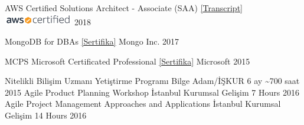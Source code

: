 
    \begin{cvhonors}
        \cvhonor
        {AWS Certified Solutions Architect - Associate (SAA)}
        {\href{https://www.certmetrics.com/amazon/public/transcript.aspx?transcript=HK7EEBT12EE41BGN}{[Transcript]}} 
        {\includegraphics[height=5mm]{./img/aws-certified-logo.png}}
        {2018}

        \cvhonor
        {MongoDB for DBAs}
        {\href{http://bit.ly/guneysu-mongodb-for-dba-certificate}{[Sertifika]}}
        {Mongo Inc.}
        {2017}

        \cvhonor
        {MCPS}
        {Microsoft Certificated Professional \href{http://docs.kariyer.net/uploadfiles/executive/0000/0000/9267/488/Certificate_1.pdf?filesec=5dY0D3Kbe72WC8jXyTXZtsqpxLi1WwOJJWy91Xr06Ix8SFBJvKdhj3YKHFnw7RaWqfs54O4Ya9qEBQFCddGhbqJe369hJjyh!e!}{[Sertifika]}}
        {Microsoft}
        {2015}
    \end{cvhonors}


    \begin{cvhonors} 
        \cvhonor
            {Nitelikli Bilişim Uzmanı Yetiştirme Programı}
            {Bilge Adam/İŞKUR}            
            {6 ay \textasciitilde 700 saat}
            {2015}
        \cvhonor
            {Agile Product Planning Workshop}
            {İstanbul Kurumsal Gelişim}            
            {7 Hours}
            {2016}
        \cvhonor
            {Agile Project Management Approaches and Applications}
            {İstanbul Kurumsal Gelişim}            
            {14 Hours}
            {2016}            
    \end{cvhonors}   

